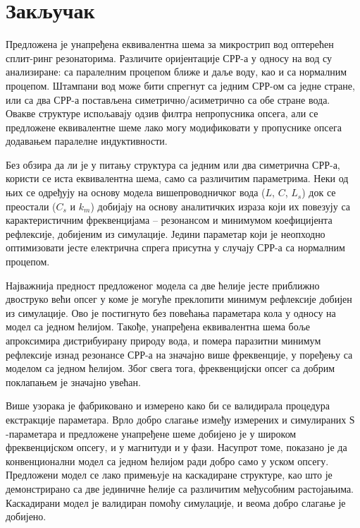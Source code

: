 \section{Закључак}
Предложена је унапређена еквивалентна шема за микрострип вод оптерећен сплит-ринг резонаторима. Различите оријентације СРР-а у односу на вод су анализиране: са паралелним процепом ближе и даље воду, као и са нормалним процепом. Штампани вод може бити спрегнут са једним СРР-ом са једне стране, или са два СРР-а постављена симетрично/асиметрично са обе стране вода. Овакве структуре испољавају одзив филтра непропусника опсега, али се предложене еквивалентне шеме лако могу модификовати у пропуснике опсега додавањем паралелне индуктивности.

Без обзира да ли је у питању структура са једним или два симетрична СРР-а, користи се иста еквивалентна шема, само са различитим параметрима. Неки од њих се одређују на основу модела вишепроводничког вода ($L$, $C$, $L_s$) док се преостали ($C_s$ и $k_m$) добијају на основу аналитичких израза који их повезују са карактеристичним фреквенцијама -- резонансом и минимумом коефицијента рефлексије, добијеним из симулације. Једини параметар који је неопходно оптимизовати јесте електрична спрега присутна у случају СРР-а са нормалним процепом.

Најважнија предност предложеног модела са две ћелије јесте приближно двоструко већи опсег у коме је могуће преклопити минимум рефлексије добијен из симулације. Ово је постигнуто без повећања параметара кола у односу на модел са једном ћелијом. Такође, унапређена еквивалентна шема боље апроксимира дистрибуирану природу вода, и помера паразитни минимум рефлексије изнад резонансе СРР-а на значајно више фреквенције, у поређењу са моделом са једном ћелијом. Због свега тога, фреквенцијски опсег са добрим поклапањем је значајно увећан.

Више узорака је фабриковано и измерено како би се валидирала процедура екстракције параметара. Врло добро слагање између измерених и симулираних $Ѕ$-параметара и предложене унапређене шеме добијено је у широком фреквенцијском опсегу, и у магнитуди и у фази. Насупрот томе, показано је да конвенционални модел са једном ћелијом ради добро само у уском опсегу. Предложени модел се лако примењује на каскадиране структуре, као што је демонстрирано са две јединичне ћелије са различитим међусобним растојањима. Каскадирани модел је валидиран помоћу симулације, и веома добро слагање је добијено.
